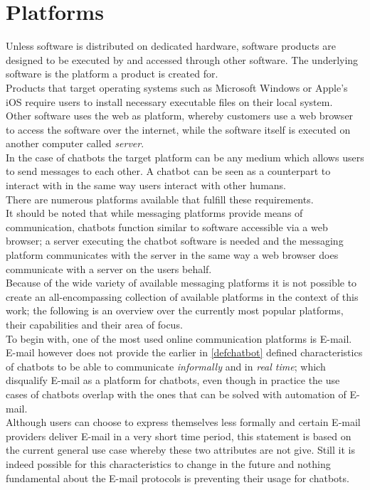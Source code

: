\section{Platforms}
\label{platforms}


Unless software is distributed on dedicated hardware, software products are designed to be executed by and accessed through other software. The underlying software is the platform a product is created for.
\\
Products that target operating systems such as Microsoft Windows or Apple's iOS require users to install necessary executable files on their local system.
\\
Other software uses the web as platform, whereby customers use a web browser to access the software over the internet, while the software itself is executed on another computer called \emph{server}.
\\

In the case of chatbots the target platform can be any medium which allows users to send messages to each other. A chatbot can be seen as a counterpart to interact with in the same way users interact with other humans.
\\

There are numerous platforms available that fulfill these requirements.
\\

It should be noted that while messaging platforms provide means of communication, chatbots function similar to software accessible via a web browser; a server executing the chatbot software is needed and the messaging platform communicates with the server in the same way a web browser does communicate with a server on the users behalf.
\\

Because of the wide variety of available messaging platforms it is not possible to create an all-encompassing collection of available platforms in the context of this work; the following is an overview over the currently most popular platforms, their capabilities and their area of focus.
\\

To begin with, one of the most used online communication platforms is E-mail.
\\
E-mail however does not provide the earlier in \ref{defchatbot} defined characteristics of chatbots to be able to communicate \emph{informally} and in \emph{real time}; which disqualify E-mail as a platform for chatbots, even though in practice the use cases of chatbots overlap with the ones that can be solved with automation of E-mail.
\\
Although users can choose to express themselves less formally and certain E-mail providers deliver E-mail in a very short time period,
this statement is based on the current general use case whereby these two attributes are not give.
Still it is indeed possible for this characteristics to change in the future
and nothing fundamental about the E-mail protocols is preventing their usage for chatbots.
\\

